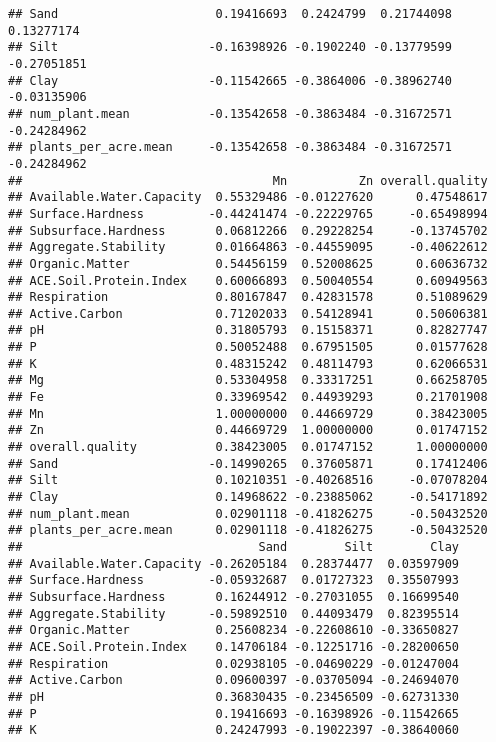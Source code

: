 \documentclass[]{article}
\begin{document}
\begin{verbatim}
## Sand                      0.19416693  0.2424799  0.21744098  0.13277174
## Silt                     -0.16398926 -0.1902240 -0.13779599 -0.27051851
## Clay                     -0.11542665 -0.3864006 -0.38962740 -0.03135906
## num_plant.mean           -0.13542658 -0.3863484 -0.31672571 -0.24284962
## plants_per_acre.mean     -0.13542658 -0.3863484 -0.31672571 -0.24284962
##                                   Mn          Zn overall.quality
## Available.Water.Capacity  0.55329486 -0.01227620      0.47548617
## Surface.Hardness         -0.44241474 -0.22229765     -0.65498994
## Subsurface.Hardness       0.06812266  0.29228254     -0.13745702
## Aggregate.Stability       0.01664863 -0.44559095     -0.40622612
## Organic.Matter            0.54456159  0.52008625      0.60636732
## ACE.Soil.Protein.Index    0.60066893  0.50040554      0.60949563
## Respiration               0.80167847  0.42831578      0.51089629
## Active.Carbon             0.71202033  0.54128941      0.50606381
## pH                        0.31805793  0.15158371      0.82827747
## P                         0.50052488  0.67951505      0.01577628
## K                         0.48315242  0.48114793      0.62066531
## Mg                        0.53304958  0.33317251      0.66258705
## Fe                        0.33969542  0.44939293      0.21701908
## Mn                        1.00000000  0.44669729      0.38423005
## Zn                        0.44669729  1.00000000      0.01747152
## overall.quality           0.38423005  0.01747152      1.00000000
## Sand                     -0.14990265  0.37605871      0.17412406
## Silt                      0.10210351 -0.40268516     -0.07078204
## Clay                      0.14968622 -0.23885062     -0.54171892
## num_plant.mean            0.02901118 -0.41826275     -0.50432520
## plants_per_acre.mean      0.02901118 -0.41826275     -0.50432520
##                                 Sand        Silt        Clay
## Available.Water.Capacity -0.26205184  0.28374477  0.03597909
## Surface.Hardness         -0.05932687  0.01727323  0.35507993
## Subsurface.Hardness       0.16244912 -0.27031055  0.16699540
## Aggregate.Stability      -0.59892510  0.44093479  0.82395514
## Organic.Matter            0.25608234 -0.22608610 -0.33650827
## ACE.Soil.Protein.Index    0.14706184 -0.12251716 -0.28200650
## Respiration               0.02938105 -0.04690229 -0.01247004
## Active.Carbon             0.09600397 -0.03705094 -0.24694070
## pH                        0.36830435 -0.23456509 -0.62731330
## P                         0.19416693 -0.16398926 -0.11542665
## K                         0.24247993 -0.19022397 -0.38640060

\end{verbatim}
\end{document}
